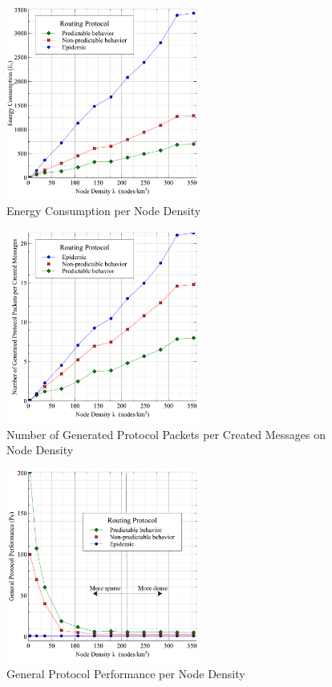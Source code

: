 \documentclass[conference]{IEEEtran}
\begin{document}
\begin{figure}[!t]
	\centering
	\includegraphics[width=2.5in]{Graphs/EnergyConsumption.pdf}
	\caption{Energy Consumption per Node Density}
	\label{Energy Consumption per Node Density}
\end{figure}

\begin{figure}[!t]
	\centering
	\includegraphics[width=2.5in]{Graphs/messages.pdf}
	\caption{Number of Generated Protocol Packets per Created Messages on Node Density}
	\label{Number of Generated Protocol Packets}
\end{figure}

\begin{figure}[!t]
\centering
\includegraphics[width=2.5in]{Graphs/ProtocolPerformance.pdf}
\caption{General Protocol Performance per Node Density}
\label{General Protocol Performance per Node Density}
\end{figure}
\end{document}
